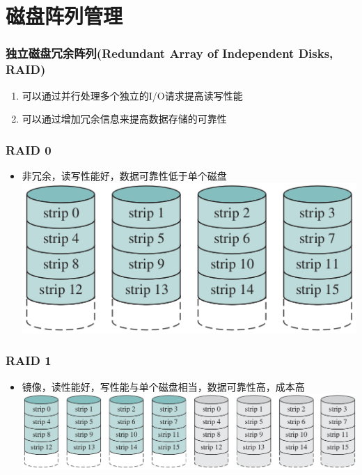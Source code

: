 \documentclass[xcolor=svgnames,presentation]{beamer}
\begin{document}
\section{磁盘阵列管理}
\label{sec-4}
\begin{frame}
\frametitle{独立磁盘冗余阵列(Redundant Array of Independent Disks, RAID)}
\label{sec-4-1}

\begin{enumerate}
\item 可以通过并行处理多个独立的I/O请求提高读写性能
\item 可以通过增加冗余信息来提高数据存储的可靠性
\end{enumerate}
\end{frame}
\begin{frame}
\frametitle{RAID 0}
\label{sec-4-2}
\begin{itemize}

\item 非冗余，读写性能好，数据可靠性低于单个磁盘\\
\label{sec-4-2-1}%
\includegraphics[width=.9\linewidth]{img/raid0.png}
\end{itemize} %
\end{frame}
\begin{frame}
\frametitle{RAID 1}
\label{sec-4-3}
\begin{itemize}

\item 镜像，读性能好，写性能与单个磁盘相当，数据可靠性高，成本高\\
\label{sec-4-3-1}%
\includegraphics[width=.9\linewidth]{img/raid1.png}
\end{itemize} %
\end{frame}
\end{document}
